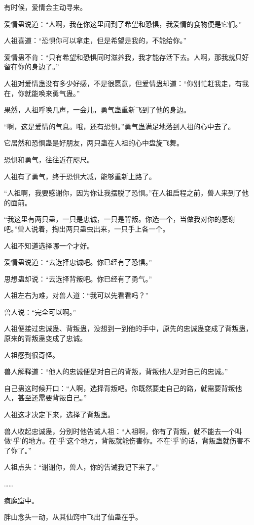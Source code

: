 \begin{this_body}
有时候，爱情会主动寻来。

爱情蛊说道：“人啊，我在你这里闻到了希望和恐惧，我爱情的食物便是它们。”

人祖喜道：“恐惧你可以拿走，但是希望是我的，不能给你。”

爱情蛊不肯：“只有希望和恐惧同时滋养我，我才能存活下去。人啊，那我就只好留在你的身边了。”

人祖对爱情蛊没有多少好感，不是很愿意，但爱情蛊却道：“你别忙赶我走，有我在，你就能唤来勇气蛊。”

果然，人祖呼唤几声，一会儿，勇气蛊重新飞到了他的身边。

“啊，这是爱情的气息。哦，还有恐惧。”勇气蛊满足地落到人祖的心中去了。

它居然和恐惧蛊是好朋友，两只蛊在人祖的心中盘旋飞舞。

恐惧和勇气，往往近在咫尺。

人祖有了勇气，终于恐惧大减，能够重新上路了。

“人祖啊，我要感谢你，因为你让我摆脱了恐惧。”在人祖启程之前，兽人来到了他的面前。

“我这里有两只蛊，一只是忠诚，一只是背叛。你选一个，当做我对你的感谢吧。”兽人说着，掏出两只蛊虫出来，一只手上各一个。

人祖不知道选择哪一个才好。

爱情蛊说道：“去选择忠诚吧。你已经有了恐惧。”

思想蛊却说：“去选择背叛吧。你已经有了勇气。”

人祖左右为难，对兽人道：“我可以先看看吗？”

兽人说：“完全可以啊。”

人祖便接过忠诚蛊、背叛蛊，没想到一到他的手中，原先的忠诚蛊变成了背叛蛊，原来的背叛蛊变成了忠诚。

人祖感到很奇怪。

兽人解释道：“他人的忠诚便是对自己的背叛，背叛他人是对自己的忠诚。”

自己蛊这时候开口：“人啊，选择背叛吧。你既然要走自己的路，就需要背叛他人，甚至还需要背叛自己。”

人祖这才决定下来，选择了背叛蛊。

兽人收起忠诚蛊，分别时他告诫人祖：“人祖啊，你有了背叛，就不能去一个叫做‘乎’的地方。在‘乎’这个地方，背叛就能伤害你。不在‘乎’的话，背叛蛊就伤害不了你了。”

人祖点头：“谢谢你，兽人，你的告诫我记下来了。”

……

疯魔窟中。

胖山念头一动，从其仙窍中飞出了仙蛊在乎。


\end{this_body}
